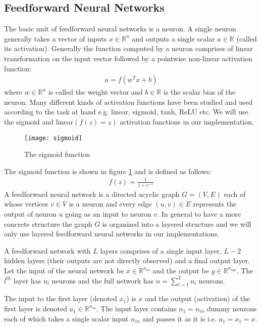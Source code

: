 \subsection{Feedforward Neural Networks}
The basic unit of feedforward neural networks is a neuron. A single neuron generally takes a vector of inputs $x \in \mathbb{R}^n$ and outputs a single scalar $a \in \mathbb{R}$ (called its activation). Generally the function computed by a neuron comprises of linear transformation on the input vector followed by a pointwise non-linear activation function:
\begin{align}
a = f(w^T x + b)
\end{align}
where $w \in \mathbb{R}^n$ is called the weight vector and $b \in \mathbb{R}$ is the scalar bias of the neuron.
Many different kinds of activation functions have been studied and used according to the task at hand e.g. linear, sigmoid, tanh, ReLU etc. We will use the sigmoid and linear$(f(z) = z)$ activation functions in our implementation.

\begin{figure}[ht]
\begin{center}
\centerline{\texttt{[image: sigmoid]}}
\caption{The sigmoid function}
\label{sigmoid}
\end{center}
\vskip -0.4in
\end{figure}

The sigmoid function is shown in figure \ref{sigmoid} and is defined as follows:
\begin{align}
f(z) = \frac{1}{1 + e^{-z}}
\end{align}
A feedforward neural network is a directed acyclic graph $G = (V,E)$ each of whose vertices $v \in V$ is a neuron and every edge $(u,v) \in E$ represents the output of neuron $u$ going as an input to neuron $v$. In general to have a more concrete structure the graph $G$ is organized into a layered structure and we will only use layered feedforward neural networks in our implementations. 

A feedforward network with $L$ layers comprises of a single input layer, $L-2$ hidden layers (their outputs are not directly observed) and a final output layer.
Let the input of the neural network be $x \in \mathbb{R}^{n_{in}}$ and the output be $y \in \mathbb{R}^{n_{out}}$.
The $l^{th}$ layer has $n_l$ neurons and the full network has $n = \sum_{l=1}^L n_l$ neurons.

The input to the first layer (denoted $x_1$) is $x$ and the output (activation) of the first layer is denoted $a_1 \in \mathbb{R}^{n_{in}}$. The input layer contains $n_1 = n_{in}$ dummy neurons each of which takes a single scalar input $n_{in}$ and passes it as it is i.e. $a_1 = x_1 = x$.

